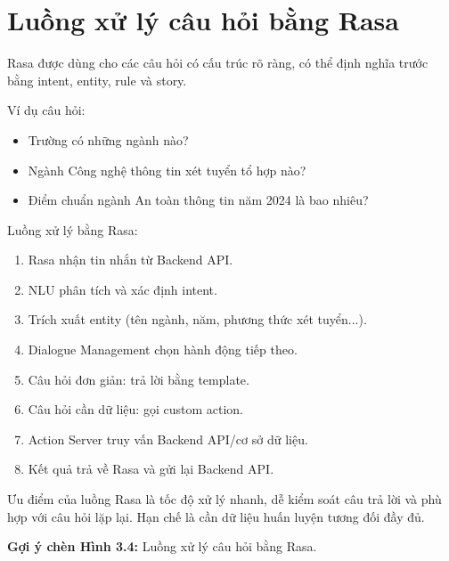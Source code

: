 ﻿\section{Luồng xử lý câu hỏi bằng Rasa}

Rasa được dùng cho các câu hỏi có cấu trúc rõ ràng, có thể định nghĩa trước bằng intent, entity, rule và story.

Ví dụ câu hỏi:
\begin{itemize}
    \item Trường có những ngành nào?
    \item Ngành Công nghệ thông tin xét tuyển tổ hợp nào?
    \item Điểm chuẩn ngành An toàn thông tin năm 2024 là bao nhiêu?
\end{itemize}

Luồng xử lý bằng Rasa:
\begin{enumerate}
    \item Rasa nhận tin nhắn từ Backend API.
    \item NLU phân tích và xác định intent.
    \item Trích xuất entity (tên ngành, năm, phương thức xét tuyển...).
    \item Dialogue Management chọn hành động tiếp theo.
    \item Câu hỏi đơn giản: trả lời bằng template.
    \item Câu hỏi cần dữ liệu: gọi custom action.
    \item Action Server truy vấn Backend API/cơ sở dữ liệu.
    \item Kết quả trả về Rasa và gửi lại Backend API.
\end{enumerate}

Ưu điểm của luồng Rasa là tốc độ xử lý nhanh, dễ kiểm soát câu trả lời và phù hợp với câu hỏi lặp lại. Hạn chế là cần dữ liệu huấn luyện tương đối đầy đủ.

\textbf{Gợi ý chèn Hình 3.4:} Luồng xử lý câu hỏi bằng Rasa.
